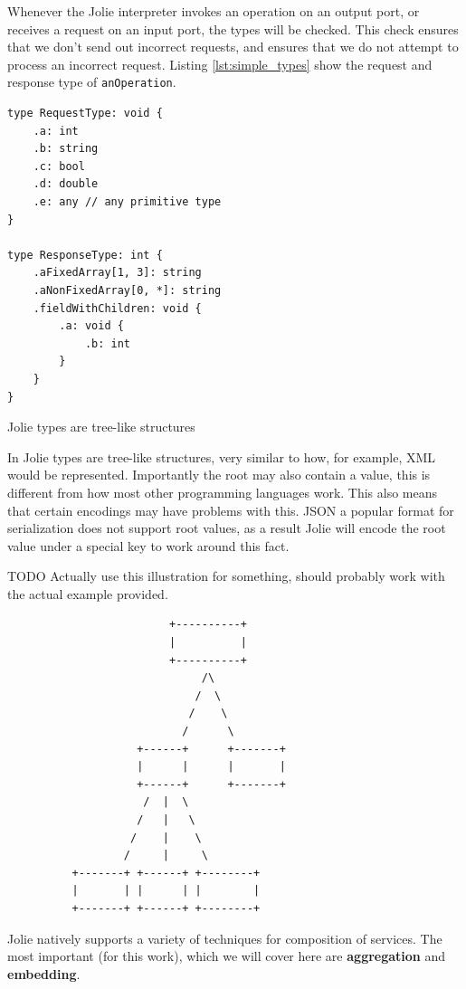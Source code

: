 Whenever the Jolie interpreter invokes an operation on an output port, or
receives a request on an input port, the types will be checked. This check
ensures that we don't send out incorrect requests, and ensures that we do not
attempt to process an incorrect request. Listing \ref{lst:simple_types} show
the request and response type of \verb!anOperation!.

\begin{listing}[H]
\begin{verbatim}
type RequestType: void {
    .a: int
    .b: string
    .c: bool
    .d: double
    .e: any // any primitive type
}

type ResponseType: int {
    .aFixedArray[1, 3]: string
    .aNonFixedArray[0, *]: string
    .fieldWithChildren: void {
        .a: void {
            .b: int
        }
    }
}
\end{verbatim}
\caption{Jolie types are tree-like structures}
\label{lst:simple_types}
\end{listing}

In Jolie types are tree-like structures, very similar to how, for example, XML
would be represented. Importantly the root may also contain a value, this is
different from how most other programming languages work. This also means that
certain encodings may have problems with this. JSON a popular format for
serialization does not support root values, as a result Jolie will encode the
root value under a special key to work around this fact.

TODO Actually use this illustration for something, should probably work with
the actual example provided.

\begin{listing}[H]
\begin{verbatim}
                         +----------+
                         |          |
                         +----------+
                              /\
                             /  \
                            /    \
                           /      \
                    +------+      +-------+
                    |      |      |       |
                    +------+      +-------+
                     /  |  \
                    /   |   \
                   /    |    \
                  /     |     \
          +-------+ +------+ +--------+
          |       | |      | |        |
          +-------+ +------+ +--------+
\end{verbatim}
\end{listing}

Jolie natively supports a variety of techniques for composition of services.
The most important (for this work), which we will cover here are
\textbf{aggregation} and \textbf{embedding}.

